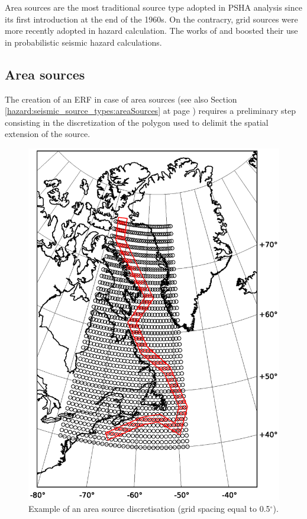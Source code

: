 Area sources are the most traditional source type adopted in PSHA analysis since 
its first introduction at the end of the 1960s. On the contracry, grid sources were more recently adopted in hazard calculation. The works of \cite{frankel1995} and \cite{frankel1997} boosted their use in probabilistic seismic hazard calculations. 
%
\subsection{Area sources}
%
The creation of an ERF in case of area sources (see also Section \ref{hazard:seismic_source_types:areaSources} at page \pageref{hazard:seismic_source_types:areaSources}) requires a preliminary step 
consisting in the discretization of the polygon used to delimit the spatial extension of the source. 

%
\begin{figure}[!ht]
\centering
\includegraphics[width=18cm]{./Figures/Part_Hazard/area_source_discretization.eps}
\caption{Example of an area source discretisation (grid spacing equal to 0.5$^\circ$).}
\label{fig:area_source_discret}
\end{figure}
%

